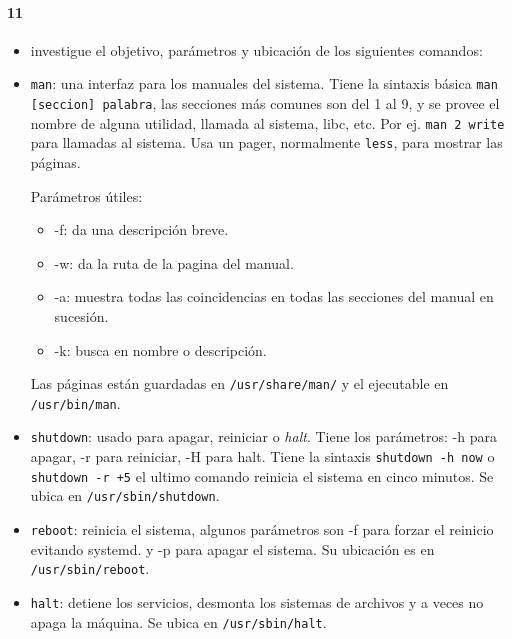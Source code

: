 \documentclass[10pt,a4paper]{paper}
\begin{document}
	\paragraph{11}
	\begin{itemize}
		\item investigue el objetivo, parámetros y ubicación de los siguientes
		comandos:
		
		
		
		
		\item \texttt{man}: una interfaz para los manuales del sistema. Tiene la
		sintaxis básica \texttt{man [seccion] palabra}, las secciones más comunes son
		del 1 al 9, y se provee el nombre de alguna utilidad, llamada al sistema, libc,
		etc. Por ej. \texttt{man 2 write} para llamadas al sistema. Usa un pager,
		normalmente \texttt{less}, para mostrar las páginas.
		
		Parámetros útiles:
		
		\begin{itemize}
			\item -f: da una descripción breve.
			\item -w: da la ruta de la pagina del manual.
			\item -a: muestra todas las coincidencias en todas las secciones del manual en
			sucesión.
			\item -k: busca en nombre o descripción.
			
		\end{itemize}
		
		Las páginas están guardadas en \texttt{/usr/share/man/} y el ejecutable en
		\texttt{/usr/bin/man}.
		
		
		\item \texttt{shutdown}: usado para apagar, reiniciar o \textit{halt}. Tiene
		los parámetros: -h para apagar, -r para reiniciar, -H para halt. Tiene la
		sintaxis \texttt{shutdown -h now} o \texttt{shutdown -r +5} el ultimo comando
		reinicia el sistema en cinco minutos. Se ubica en \texttt{/usr/sbin/shutdown}.
		
		
		\item \texttt{reboot}: reinicia el sistema, algunos parámetros son -f para
		forzar el reinicio evitando systemd. y -p para apagar el sistema. Su ubicación
		es en \texttt{/usr/sbin/reboot}.
		
		\item \texttt{halt}: detiene los servicios, desmonta los sistemas de archivos y
		a veces no apaga la máquina. Se ubica en \texttt{/usr/sbin/halt}.
		

\end{itemize}
\end{document}
